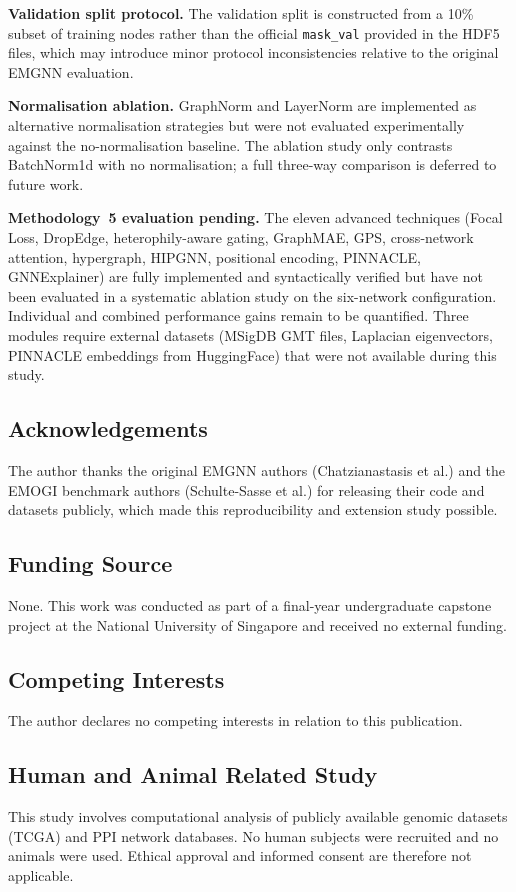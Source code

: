\textbf{Validation split protocol.} The validation split is constructed from a 10\%
subset of training nodes rather than the official \texttt{mask\_val} provided in the HDF5
files, which may introduce minor protocol inconsistencies relative to the original
EMGNN evaluation.

\textbf{Normalisation ablation.} GraphNorm and LayerNorm are implemented as alternative
normalisation strategies but were not evaluated experimentally against the no-normalisation
baseline. The ablation study only contrasts BatchNorm1d with no normalisation; a full
three-way comparison is deferred to future work.

\textbf{Methodology~5 evaluation pending.} The eleven advanced techniques (Focal Loss,
DropEdge, heterophily-aware gating, GraphMAE, GPS, cross-network attention, hypergraph,
HIPGNN, positional encoding, PINNACLE, GNNExplainer) are fully implemented and
syntactically verified but have not been evaluated in a systematic ablation study on the
six-network configuration. Individual and combined performance gains remain to be
quantified. Three modules require external datasets (MSigDB GMT files, Laplacian
eigenvectors, PINNACLE embeddings from HuggingFace) that were not available during
this study.

\subsection*{Acknowledgements}

The author thanks the original EMGNN authors (Chatzianastasis et al.) and the EMOGI
benchmark authors (Schulte-Sasse et al.) for releasing their code and datasets publicly,
which made this reproducibility and extension study possible.

\subsection*{Funding Source}

None. This work was conducted as part of a final-year undergraduate capstone project at
the National University of Singapore and received no external funding.

\subsection*{Competing Interests}

The author declares no competing interests in relation to this publication.

\subsection*{Human and Animal Related Study}

This study involves computational analysis of publicly available genomic datasets (TCGA)
and PPI network databases. No human subjects were recruited and no animals were used.
Ethical approval and informed consent are therefore not applicable.

